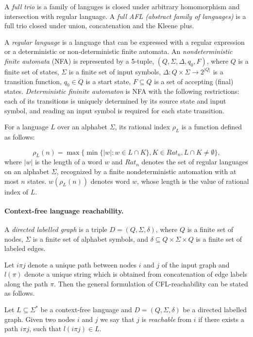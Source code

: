 A \textit{full trio} is a family of languges is closed under arbitrary homomorphism and intersection with regular language. A \textit{full AFL (abstract family of languages)} is a full trio closed under union, concatenation and the Kleene plus. 


A \textit{regular language} is a language that can be expressed with a regular expression or a deterministic or non-deterministic finite automata.
An \textit{nondeterministic finite automata} (NFA) is represented by a 5-tuple, $(Q,\Sigma ,\Delta ,q_{0},F)$, where $Q$ is a finite set of states, $\Sigma$ is a finite set of input symbols, $\Delta:Q\times \Sigma \rightarrow 2^{|Q|}$ is a transition function, $q_0 \in Q$ is a start state, $F \subseteq Q$ is a set of accepting (final) states. \textit{Deterministic fininite automaton} is NFA with the following restrictions: each of its transitions is uniquely determined by its source state and input symbol, and reading an input symbol is required for each state transition.


 For a language $L$ over an alphabet $\Sigma$, its rational index $\rho_L$ is a function defined as follows:

$$\rho_L(n) = \max\{\min\{|w|:w \in L \cap K\}, K \in {Rat}_n, L \cap K \neq \emptyset\},$$ where $|w|$ is the length of a word $w$ and ${Rat}_n$ denotes the set of regular languages on an alphabet $\Sigma$, recognized by a finite nondeterministic automation with at most $n$ states. $w(\rho_L(n))$ denotes word $w$, whose length is the value of rational index of $L$.
\paragraph{Context-free language reachability.} 
A \textit{directed labelled graph} is a triple $D = (Q, \Sigma, \delta)$, where $Q$ is a finite set of nodes, $\Sigma$ is a finite set of alphabet symbols,
and $\delta \subseteq Q \times \Sigma \times Q$ is a finite set of labeled edges. 


Let $i\pi j$ denote a unique path between nodes $i$ and $j$ of the input graph and $l(\pi)$ denote a unique string which is obtained from concatenation of edge labels along the path $\pi$. Then the general formulation of CFL-reachability can be stated as follows.
\begin{definition}
Let $L \subseteq \Sigma^*$ be a context-free language and $D = (Q, \Sigma, \delta)$ be a directed labelled graph. Given two nodes $i$ and $j$ we say that $j$ is \textit{reachable} from $i$ if there exists a path $i \pi j$, such that $l(i \pi j) \in L$. 
\end{definition}


